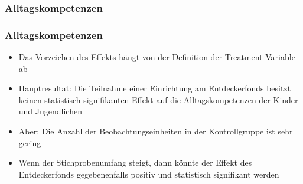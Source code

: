 \begin{frame}[fragile]
\begin{frame}[fragile]
\begin{frame}[fragile]
\frametitle{Alltagskompetenzen}
\begin{table}
\begin{center}
\end{center}
\caption{DID-Schätzung: Ergebnisse für Alltagskompetenzen}
\end{table}
\end{frame}

\begin{frame}[fragile]
\frametitle{Alltagskompetenzen}
\begin{itemize}
\item Das Vorzeichen des Effekts hängt von der Definition der Treatment-Variable ab
\item Hauptresultat: Die Teilnahme einer Einrichtung am Entdeckerfonds besitzt keinen statistisch signifikanten Effekt auf die Alltagskompetenzen der Kinder und Jugendlichen
\item Aber: Die Anzahl der Beobachtungseinheiten in der Kontrollgruppe ist sehr gering
\item Wenn der Stichprobenumfang steigt, dann könnte der Effekt des Entdeckerfonds gegebenenfalls positiv und statistisch signifikant werden
\end{itemize}
\end{frame}


\end{frame}
\end{frame}
